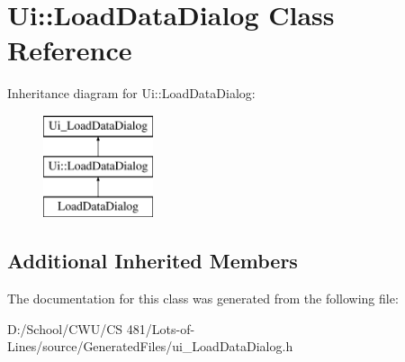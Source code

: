 \hypertarget{class_ui_1_1_load_data_dialog}{}\section{Ui\+:\+:Load\+Data\+Dialog Class Reference}
\label{class_ui_1_1_load_data_dialog}
Inheritance diagram for Ui\+:\+:Load\+Data\+Dialog\+:\begin{figure}[H]
\begin{center}
\leavevmode
\includegraphics[height=3.000000cm]{class_ui_1_1_load_data_dialog}
\end{center}
\end{figure}
\subsection*{Additional Inherited Members}


The documentation for this class was generated from the following file\+:\begin{DoxyCompactItemize}
\item 
D\+:/\+School/\+C\+W\+U/\+C\+S 481/\+Lots-\/of-\/\+Lines/source/\+Generated\+Files/ui\+\_\+\+Load\+Data\+Dialog.\+h\end{DoxyCompactItemize}

